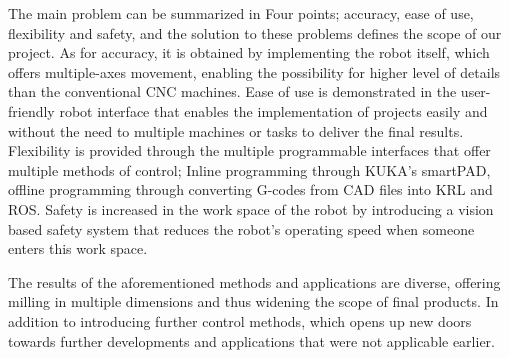 The main problem can be summarized in Four points; accuracy, ease of use, flexibility and safety, and the solution to these problems defines the scope of our project. As for accuracy, it is obtained by implementing the robot itself, which offers multiple-axes movement, enabling the possibility for higher level of details than the conventional CNC machines. Ease of use is demonstrated in the user-friendly robot interface that enables the implementation of projects easily and without the need to multiple machines or tasks to deliver the final results. Flexibility is provided through the multiple programmable interfaces that offer multiple methods of control; Inline programming through KUKA’s smartPAD, offline programming through converting G-codes from CAD files into KRL and ROS. Safety is increased in the work space of the robot by introducing a vision based safety system that reduces the robot’s operating speed when someone enters this work space.


The results of the aforementioned methods and applications are diverse, offering milling in multiple dimensions and thus widening the scope of final products. In addition to introducing further control methods, which opens up new doors towards further developments and applications that were not applicable earlier.
